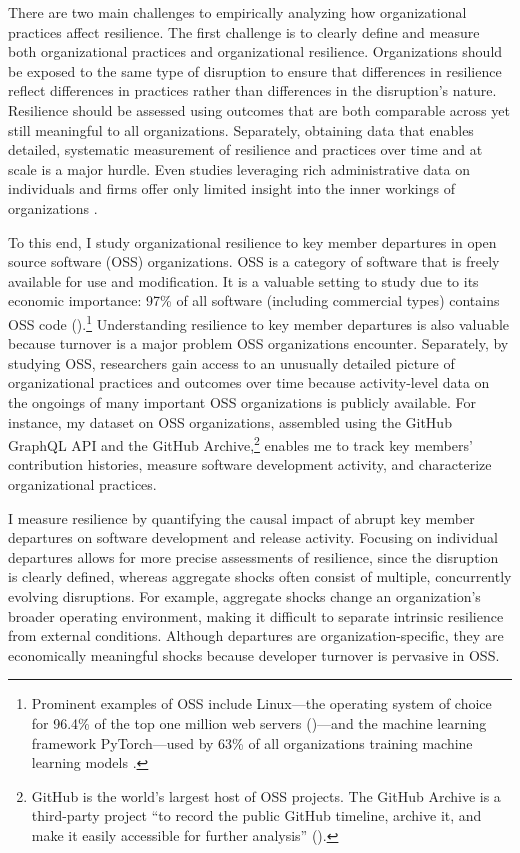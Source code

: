 \documentclass[12pt,notitlepage]{article}
\begin{document}
There are two main challenges to empirically analyzing how organizational practices affect resilience.
The first challenge is to clearly define and measure both organizational practices and organizational resilience. 
Organizations should be exposed to the same type of disruption to ensure that differences in resilience reflect differences in practices rather than differences in the disruption's nature. 
Resilience should be assessed using outcomes that are both comparable across yet still meaningful to all organizations.
Separately, obtaining data that enables detailed, systematic measurement of resilience and practices over time and at scale is a major hurdle. 
Even studies leveraging rich administrative data on individuals and firms offer only limited insight into the inner workings of organizations \citep{jaravel_team-specific_2018, jager_how_2024}. 

To this end, I study organizational resilience to key member departures in open source software (OSS) organizations.
OSS is a category of software that is freely available for use and modification. 
It is a valuable setting to study due to its economic importance: 97\% of all software (including commercial types) contains OSS code (\citealt{fred_bals_six_2025}).\footnote{Prominent examples of OSS include Linux—the operating system of choice for 96.4\% of the top one million web servers (\citealt{w3cook_os_2015})—and the machine learning framework PyTorch—used by 63\% of all organizations training machine learning models \citep{lawson_shaping_2024}.} 
Understanding resilience to key member departures is also valuable because turnover is a major problem OSS organizations encounter. 
Separately, by studying OSS, researchers gain access to an unusually detailed picture of organizational practices and outcomes over time because activity-level data on the ongoings of many important OSS organizations is publicly available.
For instance, my dataset on OSS organizations, assembled using the GitHub GraphQL API and the GitHub Archive,\footnote{GitHub is the world's largest host of OSS projects. 
The GitHub Archive is a third-party project ``to record the public GitHub timeline, archive it, and make it easily accessible for further analysis'' (\citealt{GitHub_archive_GitHub_2025}).} enables me to track key members' contribution histories, measure software development activity, and characterize organizational practices. 

I measure resilience by quantifying the causal impact of abrupt key member departures on software development and release activity.
Focusing on individual departures allows for more precise assessments of resilience, since the disruption is clearly defined, whereas aggregate shocks often consist of multiple, concurrently evolving disruptions. 
For example, aggregate shocks change an organization’s broader operating environment, making it difficult to separate intrinsic resilience from external conditions. 
Although departures are organization-specific, they are economically meaningful shocks because developer turnover is pervasive in OSS.
\end{document}
